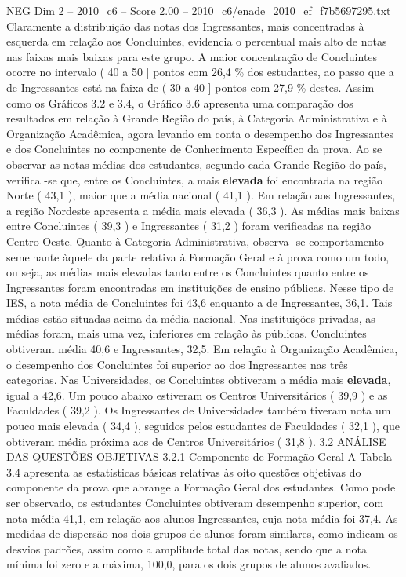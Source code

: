 \begin{textsample}{NEG Dim 2 – 2010\_c6 – Score 2.00 – 2010\_c6/enade\_2010\_ef\_f7b5697295.txt}
Claramente a distribuição das notas dos Ingressantes, mais concentradas à esquerda em relação aos Concluintes, evidencia o percentual mais alto de notas nas faixas mais baixas para este grupo.
A maior concentração de Concluintes ocorre no intervalo ( 40 a 50 ] pontos com 26,4 \% dos estudantes, ao passo que a de Ingressantes está na faixa de ( 30 a 40 ] pontos com 27,9 \% destes.
Assim como os Gráficos 3.2 e 3.4, o Gráfico 3.6 apresenta uma comparação dos resultados em relação à Grande Região do país, à Categoria Administrativa e à Organização Acadêmica, agora levando em conta o desempenho dos Ingressantes e dos Concluintes no componente de Conhecimento Específico da prova.
Ao se observar as notas médias dos estudantes, segundo cada Grande Região do país, verifica -se que, entre os Concluintes, a mais \textbf{elevada} foi encontrada na região Norte ( 43,1 ), maior que a média nacional ( 41,1 ).
Em relação aos Ingressantes, a região Nordeste apresenta a média mais elevada ( 36,3 ).
As médias mais baixas entre Concluintes ( 39,3 ) e Ingressantes ( 31,2 ) foram verificadas na região Centro-Oeste.
Quanto à Categoria Administrativa, observa -se comportamento semelhante àquele da parte relativa à Formação Geral e à prova como um todo, ou seja, as médias mais elevadas tanto entre os Concluintes quanto entre os Ingressantes foram encontradas em instituições de ensino públicas.
Nesse tipo de IES, a nota média de Concluintes foi 43,6 enquanto a de Ingressantes, 36,1.
Tais médias estão situadas acima da média nacional.
Nas instituições privadas, as médias foram, mais uma vez, inferiores em relação às públicas.
Concluintes obtiveram média 40,6 e Ingressantes, 32,5.
Em relação à Organização Acadêmica, o desempenho dos Concluintes foi superior ao dos Ingressantes nas três categorias.
Nas Universidades, os Concluintes obtiveram a média mais \textbf{elevada}, igual a 42,6.
Um pouco abaixo estiveram os Centros Universitários ( 39,9 ) e as Faculdades ( 39,2 ).
Os Ingressantes de Universidades também tiveram nota um pouco mais elevada ( 34,4 ), seguidos pelos estudantes de Faculdades ( 32,1 ), que obtiveram média próxima aos de Centros Universitários ( 31,8 ). 3.2 ANÁLISE DAS QUESTÕES OBJETIVAS 3.2.1 Componente de Formação Geral A Tabela 3.4 apresenta as estatísticas básicas relativas às oito questões objetivas do componente da prova que abrange a Formação Geral dos estudantes.
Como pode ser observado, os estudantes Concluintes obtiveram desempenho superior, com nota média 41,1, em relação aos alunos Ingressantes, cuja nota média foi 37,4.
As medidas de dispersão nos dois grupos de alunos foram similares, como indicam os desvios padrões, assim como a amplitude total das notas, sendo que a nota mínima foi zero e a máxima, 100,0, para os dois grupos de alunos avaliados.

\end{textsample}
